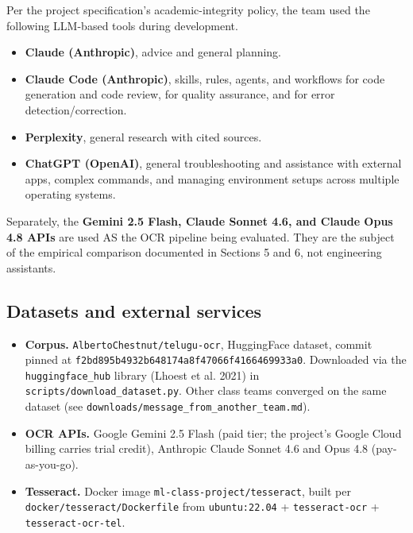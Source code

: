 \documentclass[
  letterpaper,
  DIV=11,
  numbers=noendperiod]{scrartcl}
\providecommand{\tightlist}{%
  \setlength{\itemsep}{0pt}\setlength{\parskip}{0pt}}
\begin{document}
Per the project specification's academic-integrity policy, the team used
the following LLM-based tools during development.

\begin{itemize}
\tightlist
\item
  \textbf{Claude (Anthropic)}, advice and general planning.
\item
  \textbf{Claude Code (Anthropic)}, skills, rules, agents, and workflows
  for code generation and code review, for quality assurance, and for
  error detection/correction.
\item
  \textbf{Perplexity}, general research with cited sources.
\item
  \textbf{ChatGPT (OpenAI)}, general troubleshooting and assistance with
  external apps, complex commands, and managing environment setups
  across multiple operating systems.
\end{itemize}

Separately, the \textbf{Gemini 2.5 Flash, Claude Sonnet 4.6, and Claude
Opus 4.8 APIs} are used AS the OCR pipeline being evaluated. They are
the subject of the empirical comparison documented in Sections 5 and 6,
not engineering assistants.

\subsection{Datasets and external
services}\label{datasets-and-external-services}

\begin{itemize}
\tightlist
\item
  \textbf{Corpus.} \texttt{AlbertoChestnut/telugu-ocr}, HuggingFace
  dataset, commit pinned at
  \texttt{f2bd895b4932b648174a8f47066f4166469933a0}. Downloaded via the
  \texttt{huggingface\_hub} library ({Lhoest et al.} 2021) in
  \texttt{scripts/download\_dataset.py}. Other class teams converged on
  the same dataset (see
  \texttt{downloads/message\_from\_another\_team.md}).
\item
  \textbf{OCR APIs.} Google Gemini 2.5 Flash (paid tier; the project's
  Google Cloud billing carries trial credit), Anthropic Claude Sonnet
  4.6 and Opus 4.8 (pay-as-you-go).
\item
  \textbf{Tesseract.} Docker image \texttt{ml-class-project/tesseract},
  built per \texttt{docker/tesseract/Dockerfile} from
  \texttt{ubuntu:22.04} + \texttt{tesseract-ocr} +
  \texttt{tesseract-ocr-tel}.
\end{itemize}
\end{document}
